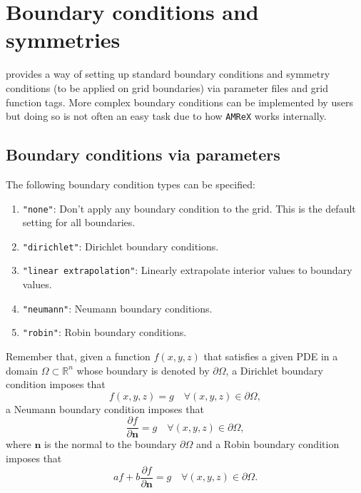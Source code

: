 \section{Boundary conditions and symmetries}
\label{sec:bcs}

\CarpetX\space provides a way of setting up standard boundary conditions and symmetry conditions (to be applied on grid boundaries) via parameter files and grid function tags. More complex boundary conditions can be implemented by users but doing so is not often an easy task due to how \texttt{AMReX} works internally.

\subsection{Boundary conditions via parameters}

The following boundary condition types can be specified:

\begin{enumerate}
    \item \texttt{"none"}: Don't apply any boundary condition to the grid. This is the default setting for all boundaries.
    \item \texttt{"dirichlet"}: Dirichlet boundary conditions.
    \item \texttt{"linear extrapolation"}: Linearly extrapolate interior values to boundary values.
    \item \texttt{"neumann"}: Neumann boundary conditions.
    \item \texttt{"robin"}: Robin boundary conditions.
\end{enumerate}

Remember that, given a function $f(x,y,z)$ that satisfies a given PDE in a domain $\Omega \subset \mathbb{R}^n$ whose boundary is denoted by $\partial\Omega$, a Dirichlet boundary condition imposes that
%
\begin{equation}
  f(x,y,z) = g \quad \forall (x,y,z) \in \partial \Omega,
  \label{eq:dirichlet}
\end{equation}
%
a Neumann boundary condition imposes that
%
\begin{equation}
  \frac{\partial f}{\partial \mathbf{n}} = g \quad \forall (x,y,z) \in \partial \Omega,
  \label{eq:neumann}
\end{equation}
%
where $\mathbf{n}$ is the normal to the boundary $\partial \Omega$ and a Robin boundary condition imposes that
%
\begin{equation}
  a f + b \frac{\partial f}{\partial \mathbf{n}} = g \quad \forall (x,y,z) \in \partial \Omega.
  \label{eq:robin}
\end{equation}

